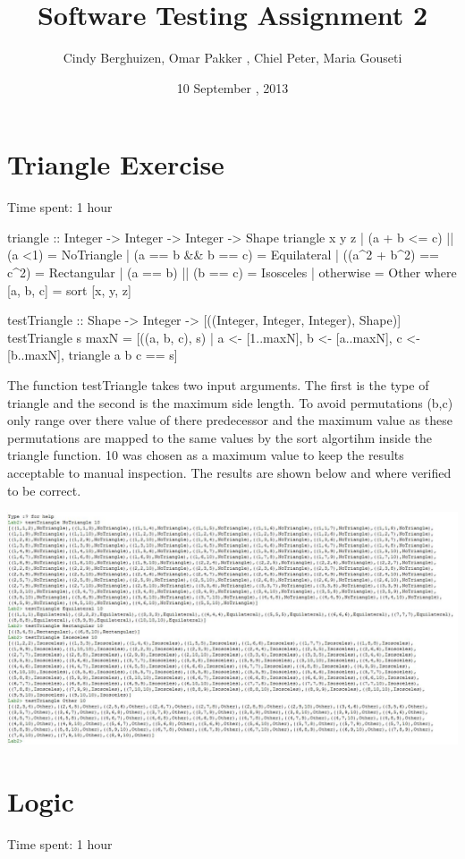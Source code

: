 \documentclass{article}
\begin{document}
\setlength{\parindent}{0cm}

\title{Software Testing Assignment 2}
\author{Cindy Berghuizen, Omar Pakker , Chiel Peter, Maria Gouseti}
\date{10 September , 2013}
\maketitle
\section*{Triangle Exercise}
Time spent: 1 hour
\begin{code}
triangle :: Integer -> Integer -> Integer -> Shape
triangle x y z		| (a + b <= c) || (a <1)	= NoTriangle
 			| (a == b && b == c) 		= Equilateral
 			| ((a^2 + b^2) == c^2) 		= Rectangular
 			| (a == b) || (b == c) 		= Isosceles
 			| otherwise			= Other
 			where [a, b, c] = sort [x, y, z]

testTriangle :: Shape -> Integer -> [((Integer, Integer, Integer), Shape)]
testTriangle s maxN = [((a, b, c), s)	| a <- [1..maxN], 
					  b <- [a..maxN], 
					  c <- [b..maxN], 
					  triangle a b c == s]
\end{code}

The function testTriangle takes two input arguments. The first is the type of triangle and the second is the maximum side length. To avoid permutations (b,c) only range over there value of there predecessor and the maximum value as these permutations are mapped to the same values by the sort algortihm inside the triangle function. 10 was chosen as  a maximum value to keep the results acceptable to manual inspection. The results are shown below and where verified to be correct.
\vspace{.3cm}

\includegraphics[scale=0.58]{Knipsel}

\section*{ Logic}
Time spent: 1 hour
\end{document}
